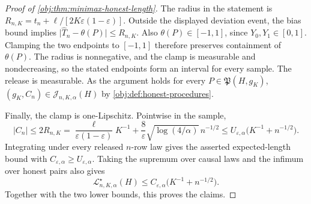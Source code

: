 \documentclass[11pt]{article}
\begin{document}
\begin{proof}[Proof of \cref{obj:thm:minimax-honest-length}]
The radius in the statement is \(R_{n,K}=t_n+\ell/[2K\varepsilon(1-\varepsilon)]\). Outside the displayed deviation event, the bias bound implies
\(\lvert\widehat T_n-\theta(P)\rvert\leq R_{n,K}\). Also \(\theta(P)\in[-1,1]\), since \(Y_0,Y_1\in[0,1]\). Clamping the two endpoints to \([-1,1]\) therefore preserves containment of \(\theta(P)\). The radius is nonnegative, and the clamp is measurable and nondecreasing, so the stated endpoints form an interval for every sample. The release is measurable. As the argument holds for every \(P\in\mathfrak P(H,g_K)\), \((g_K,C_n)\in\mathcal J_{n,K,\alpha}(H)\) by \cref{obj:def:honest-procedures}. %

Finally, the clamp is one-Lipschitz. Pointwise in the sample,
\[
|C_n|
\leq 2R_{n,K}
=\frac{\ell}{\varepsilon(1-\varepsilon)}K^{-1}
 +\frac8\varepsilon\sqrt{\log(4/\alpha)}\,n^{-1/2}
\leq U_{\varepsilon,\alpha}
 \bigl(K^{-1}+n^{-1/2}\bigr).
\]
Integrating under every released \(n\)-row law gives the asserted expected-length bound with \(C_{\varepsilon,\alpha}\geq U_{\varepsilon,\alpha}\). Taking the supremum over causal laws and the infimum over honest pairs also gives
\[
\mathcal L^\star_{n,K,\alpha}(H)
\leq C_{\varepsilon,\alpha}\bigl(K^{-1}+n^{-1/2}\bigr).
\]
Together with the two lower bounds, this proves the claims. %
\end{proof}
\end{document}
